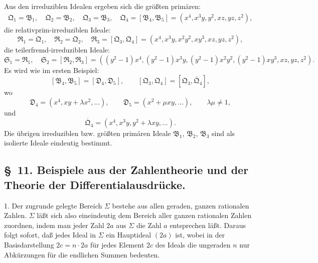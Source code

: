\documentclass[11pt]{article}
\newcommand{\ideal}[1]{\mathfrak{#1}}
\begin{document}
Aus den irreduziblen Idealen ergeben sich die größten primären:
\[
\begin{gathered}
 \ideal Q_1=\ideal B_1,
 \quad \ideal Q_2=\ideal B_2,
 \quad \ideal Q_3=\ideal B_3,
 \quad
 \ideal Q_4=[\ideal B_4,\ideal B_5]=(x^4,x^3y,y^2,xz,yz,z^2),
\end{gathered}
\]
die relativprim-irreduziblen Ideale:
\[
 \ideal R_1=\ideal Q_1,
 \quad \ideal R_2=\ideal Q_2,
 \quad
 \ideal R_3=[\ideal Q_3,\ideal Q_4]=(x^4,x^3y,x^2y^2,xy^3,xz,yz,z^2),
\]
die teilerfremd-irreduziblen Ideale:
\[
 \ideal S_1=\ideal R_1,
 \quad \ideal S_2=[\ideal R_2,\ideal R_3]
 =((y^2-1)x^4,(y^2-1)x^3y,(y^2-1)x^2y^2,
 (y^2-1)xy^3,xz,yz,z^2).
\]
Es wird wie im ersten Beispiel:
\[
 [\ideal B_4,\ideal B_5]=[\ideal D_4,\ideal D_5],
 \qquad
 [\ideal Q_3,\ideal Q_4]=[\ideal Q_3,
\overline{\ideal Q}_4],
\]
wo
\[
 \ideal D_4=(x^4,xy+\lambda x^2,\ldots),\qquad
 \ideal D_5=(x^2+\mu xy,\ldots),\qquad \lambda\mu\ne1,
\]
und
\[
 \overline{\ideal Q}_4=(x^4,x^3y,y^2+\lambda xy,\ldots).
\]
Die übrigen irreduziblen bzw. größten primären Ideale $\ideal B_1$, $\ideal B_2$, $\ideal B_3$ sind als isolierte Ideale eindeutig bestimmt.

\subsection*{\S~11. Beispiele aus der Zahlentheorie und der Theorie der Differentialausdrücke.}

1. Der zugrunde gelegte Bereich $\Sigma$ bestehe aus allen geraden, ganzen rationalen Zahlen. $\Sigma$ läßt sich also eineindeutig dem Bereich aller ganzen rationalen Zahlen zuordnen, indem man jeder Zahl $2a$ aus $\Sigma$ die Zahl $a$ entsprechen läßt. Daraus folgt sofort, daß jedes Ideal in $\Sigma$ ein Hauptideal $(2a)$ ist, wobei in der Basisdarstellung $2c=n\cdot2a$ für jedes Element $2c$ des Ideals die ungeraden $n$ nur Abkürzungen für die endlichen Summen bedeuten.
\end{document}
